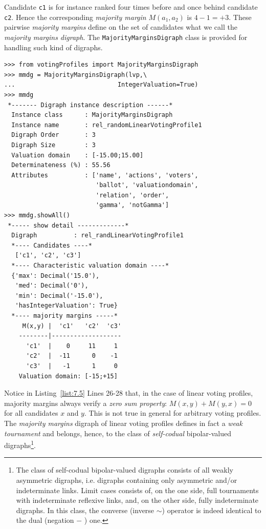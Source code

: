 Candidate \texttt{c1} is for instance ranked four times before and once behind candidate \texttt{c2}. Hence the corresponding \emph{majority margin} $M(a_1,a_2)$ is $4 - 1 = +3$. These pairwise \emph{majority margins} define on the set of candidates what we call the \emph{majority margins digraph}. The \texttt{MajorityMarginsDigraph} class is provided for handling such kind of digraphs.
\begin{lstlisting}[caption={Example of \emph{Majority Margins} digraph},label=list:7.5]
>>> from votingProfiles import MajorityMarginsDigraph
>>> mmdg = MajorityMarginsDigraph(lvp,\
...                            IntegerValuation=True)
>>> mmdg
 *------- Digraph instance description ------*
  Instance class      : MajorityMarginsDigraph
  Instance name       : rel_randomLinearVotingProfile1
  Digraph Order       : 3
  Digraph Size        : 3
  Valuation domain    : [-15.00;15.00]
  Determinateness (%) : 55.56
  Attributes          : ['name', 'actions', 'voters',
                         'ballot', 'valuationdomain',
                         'relation', 'order',
                         'gamma', 'notGamma']
>>> mmdg.showAll()
 *----- show detail -------------*
  Digraph          : rel_randLinearVotingProfile1
  *---- Candidates ----*
   ['c1', 'c2', 'c3']
  *---- Characteristic valuation domain ----*
  {'max': Decimal('15.0'),
   'med': Decimal('0'),
   'min': Decimal('-15.0'),
   'hasIntegerValuation': True}
  *---- majority margins -----*
     M(x,y) |  'c1'   'c2'  'c3'	  
    --------|-------------------
      'c1'  |    0     11     1	 
      'c2'  |  -11      0    -1	 
      'c3'  |   -1      1     0	 
    Valuation domain: [-15;+15]
\end{lstlisting}

Notice in Listing~\vref{list:7.5} Lines 26-28 that, in the case of linear voting profiles, majority margins always verify a \emph{zero sum property}: $M(x,y) + M(y,x) = 0$ for all candidates $x$ and $y$. This is not true in general for arbitrary voting profiles. The \emph{majority margins} digraph of linear voting profiles defines in fact a \emph{weak tournament} and belongs, hence, to the class of \emph{self-codual} bipolar-valued digraphs\footnote{The class of self-codual bipolar-valued digraphs consists of all weakly asymmetric digraphs, i.e. digraphs containing only asymmetric and/or indeterminate links. Limit cases consists of, on the one side, full tournaments with indeterminate reflexive links, and, on the other side, fully indeterminate digraphs. In this class, the converse (inverse $\sim$) operator is indeed identical to the dual (negation $-$ ) one.}.
    
